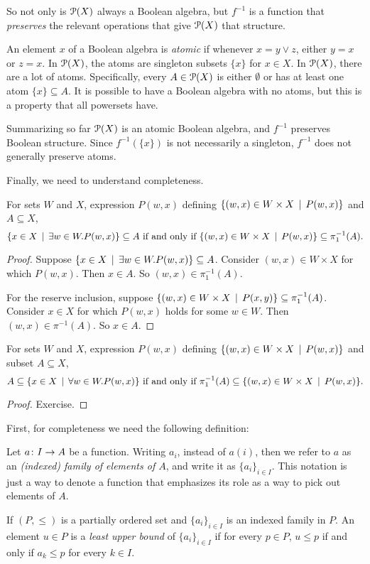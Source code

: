 So not only is ${\mathcal{P}}(X)$ always a Boolean algebra, but $f^{-1}$ is a function that \emph{preserves} the relevant operations that give ${\mathcal{P}}(X)$ that structure.

An element $x$ of a Boolean algebra is \emph{atomic} if whenever $x = y\vee z$,
either $y=x$ or $z=x$. In ${\mathcal{P}}(X)$, the atoms are singleton subsets $\{x\}$
for $x\in X$. In ${\mathcal{P}}(X)$, there are a lot of atoms. Specifically, 
every $A\in{\mathcal{P}}(X)$ is either $\emptyset$ or has at least one atom $\{x\}\subseteq A$. It is possible to have a Boolean algebra with no atoms, but this is a property that all powersets have.

Summarizing so far ${\mathcal{P}}(X)$ is an atomic Boolean algebra, and $f^{-1}$ preserves Boolean structure. Since $f^{-1}(\{x\})$ is not necessarily a singleton,
$f^{-1}$ does not generally preserve atoms.

Finally, we need to understand completeness.

\begin{lemma}
	For sets $W$ and $X$, expression $P(w,x)$ defining $\{(w,x)\in W\times X\,\mid\, P(w,x)\}$ and $A\subseteq X$,
	\[\text{$\{x\in X\,\mid\, \exists w\in W.P(w,x)\} \subseteq A$ if and only if $\{(w,x)\in W\times X\,\mid\, P(w,x)\} \subseteq \pi_1^{-1}(A)$.}\] 
	
	\begin{proof}
		Suppose $\{x\in X\,\mid\, \exists w\in W.P(w,x)\}\subseteq A$.
		Consider $(w,x)\in W\times X$ for which $P(w,x)$.
		Then $x\in A$. So $(w,x)\in \pi_1^{-1}(A)$. 
		
		For the reserve inclusion, suppose $\{(w,x)\in W\times X\,\mid\, P(x,y)\}\subseteq \pi_1^{-1}(A)$.
		Consider $x\in X$ for which $P(w,x)$ holds for some $w\in W$.
		Then $(w,x)\in \pi^{-1}(A)$.
		So $x\in A$.
	\end{proof}
\end{lemma}

\begin{lemma}
	For sets $W$ and $X$, expression $P(w,x)$ defining $\{(w,x)\in W\times X\,\mid\, P(w,x)\}$ and subset $A\subseteq X$,
	\[\text{$A\subseteq \{x\in X\,\mid\, \forall w\in W.P(w,x)\}$ if and only if 
		$\pi_1^{-1}(A)\subseteq \{(w,x)\in W\times X\,\mid\, P(w,x)\}$.}\]
	
	\begin{proof}
		Exercise.
	\end{proof} 	
\end{lemma}

First, for completeness we need the following definition:
\begin{defn}
	Let ${a}\colon{I}\to{A}$ be a function. Writing $a_i$,
	instead of $a(i)$, then we refer to $a$ as an \emph{(indexed) family of elements of $A$}, and write it as $\{a_i\}_{i\in I}$. This notation is just a way to denote a function that emphasizes its role as a way to pick out elements of $A$.
	
	If $(P,\leq)$ is a partially ordered set and $\{a_i\}_{i\in I}$ is an indexed family in $P$. An element $u\in P$ is a \emph{least upper bound} of $\{a_i\}_{i\in I}$ if for every $p\in P$, $u\leq p$ if and only if $a_k\leq p$ 
	for every $k\in I$. 
\end{defn}

